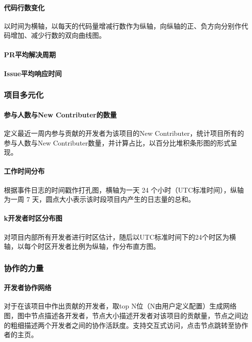 \paragraph{代码行数变化} 以时间为横轴，以每天的代码量增减行数作为纵轴，向纵轴的正、负方向分别作代码增加、减少行数的双向曲线图。
\paragraph{PR平均解决周期} 
\paragraph{Issue平均响应时间} 


\subsubsection{项目多元化}
\paragraph{参与人数与New Contributer的数量} 定义最近一周内参与贡献的开发者为该项目的New Contributer，统计项目所有的参与人数与New Contributer数量，并计算占比，以百分比堆积条形图的形式呈现。
\paragraph{工作时间分布} 根据事件日志的时间戳作打孔图，横轴为一天 24 个小时（UTC标准时间），纵轴为一周 7 天，圆点大小表示该时段项目内产生的日志量的总和。
\paragraph{k开发者时区分布图} 对项目内部所有开发者进行时区估计，随后以UTC标准时间下的24个时区为横轴，以每个时区开发者比例为纵轴，作分布直方图。

\subsubsection{协作的力量}
\paragraph{开发者协作网络} 对于在该项目中作出贡献的开发者，取top N位（N由用户定义配置）生成网络图，图中节点描述各开发者，节点大小描述开发者对该项目的贡献量，节点之间边的粗细描述两个开发者之间的协作活跃度。支持交互式访问，点击节点跳转至协作者的主页。

